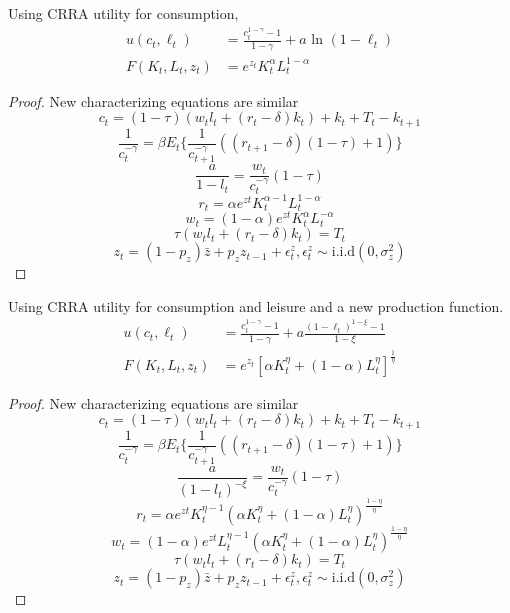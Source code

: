 \documentclass[12pt]{article}
\newenvironment{problem}[2][Problem]{\begin{trivlist}
\item[\hskip \labelsep {\bfseries #1}\hskip \labelsep {\bfseries #2.}]}{\end{trivlist}}
\begin{document}
\begin{problem}{3}
Using CRRA utility for consumption,
\begin{equation}\label{DSGE_HW_CharEq_CES_Ln_eq01}
\begin{split}
u(c_t,\ell_t) & = \frac{c^{1-\gamma}_t -1}{1-\gamma}+ a \text{ ln }(1-\ell_t)\\
F(K_t,L_t,z_t) & = e^{z_t}K^{\alpha}_t L^{1-\alpha}_t  \nonumber
\end{split}
\end{equation}
\begin{proof}
New characterizing equations are similar
$$c_t = (1-\tau)(w_tl_t + (r_t -\delta)k_t) + k_t + T_t - k_{t+1}$$
$$\frac{1}{c_t^{-\gamma}} = \beta E_t \big\{ \frac{1}{c_{t+1}^{-\gamma}}((r_{t+1} - \delta)(1-\tau)+ 1) \big\}$$
$$\frac{a}{1-l_t} = \frac{w_t}{c_t^{-\gamma}}(1-\tau)$$
$$r_t = \alpha e^{zt}K_t^{\alpha-1} L_t^{1-\alpha}$$
$$w_t = (1-\alpha) e^{zt}K_t^{\alpha} L_t^{-\alpha}$$
$$\tau(w_tl_t + (r_t -\delta)k_t) = T_t$$
$$z_t = (1-p_z)\bar{z} + p_zz_{t-1} + \epsilon^z_t,  \epsilon^z_t \sim \text{i.i.d}(0, \sigma^2_z)$$
\end{proof}
\end{problem}


\begin{problem}{4}
Using CRRA utility for consumption and leisure and a new production function.
\begin{equation}\label{DSGE_HW_CharEq_CES_eq01}
\begin{split}
u(c_t,\ell_t) & = \frac{c^{1-\gamma}_t -1}{1-\gamma}+ a \frac{(1-\ell_t)^{1-\xi}-1}{1-\xi}      \\
F(K_t,L_t,z_t) & = e^{z_t}\left[\alpha K^{\eta}_t +(1-\alpha)L^{\eta}_t \right]^{\frac{1}{\eta}}   \nonumber
\end{split}
\end{equation}
\begin{proof}
New characterizing equations are similar
$$c_t = (1-\tau)(w_tl_t + (r_t -\delta)k_t) + k_t + T_t - k_{t+1}$$
$$\frac{1}{c_t^{-\gamma}} = \beta E_t \big\{ \frac{1}{c_{t+1}^{-\gamma}}((r_{t+1} - \delta)(1-\tau)+ 1) \big\}$$
$$\frac{a}{(1-l_t)^{-\xi}} = \frac{w_t}{c_t^{-\gamma}}(1-\tau)$$
$$r_t = \alpha e^{zt}K_t^{\eta-1} (\alpha K_t^\eta+ (1-\alpha)L_t^\eta)^{\frac{1-\eta}{\eta}}$$
$$w_t = (1-\alpha) e^{zt}L_t^{\eta-1}(\alpha K_t^\eta+ (1-\alpha)L_t^\eta)^{\frac{1-\eta}{\eta}}$$
$$\tau(w_tl_t + (r_t -\delta)k_t) = T_t$$
$$z_t = (1-p_z)\bar{z} + p_zz_{t-1} + \epsilon^z_t,  \epsilon^z_t \sim \text{i.i.d}(0, \sigma^2_z)$$
\end{proof}
\end{problem}
\end{document}
